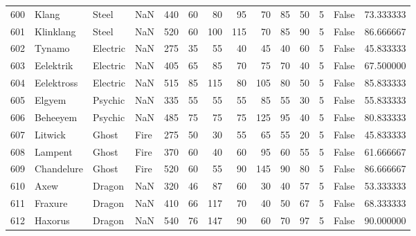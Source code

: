 \begin{tabular}{rlllrrrrrrrrlr}
 600 &                      Klang &     Steel &       NaN &    440 &   60 &      80 &       95 &       70 &       85 &     50 &           5 &      False &   73.333333 \\
 601 &                  Klinklang &     Steel &       NaN &    520 &   60 &     100 &      115 &       70 &       85 &     90 &           5 &      False &   86.666667 \\
 602 &                     Tynamo &  Electric &       NaN &    275 &   35 &      55 &       40 &       45 &       40 &     60 &           5 &      False &   45.833333 \\
 603 &                  Eelektrik &  Electric &       NaN &    405 &   65 &      85 &       70 &       75 &       70 &     40 &           5 &      False &   67.500000 \\
 604 &                 Eelektross &  Electric &       NaN &    515 &   85 &     115 &       80 &      105 &       80 &     50 &           5 &      False &   85.833333 \\
 605 &                     Elgyem &   Psychic &       NaN &    335 &   55 &      55 &       55 &       85 &       55 &     30 &           5 &      False &   55.833333 \\
 606 &                   Beheeyem &   Psychic &       NaN &    485 &   75 &      75 &       75 &      125 &       95 &     40 &           5 &      False &   80.833333 \\
 607 &                    Litwick &     Ghost &      Fire &    275 &   50 &      30 &       55 &       65 &       55 &     20 &           5 &      False &   45.833333 \\
 608 &                    Lampent &     Ghost &      Fire &    370 &   60 &      40 &       60 &       95 &       60 &     55 &           5 &      False &   61.666667 \\
 609 &                 Chandelure &     Ghost &      Fire &    520 &   60 &      55 &       90 &      145 &       90 &     80 &           5 &      False &   86.666667 \\
 610 &                       Axew &    Dragon &       NaN &    320 &   46 &      87 &       60 &       30 &       40 &     57 &           5 &      False &   53.333333 \\
 611 &                    Fraxure &    Dragon &       NaN &    410 &   66 &     117 &       70 &       40 &       50 &     67 &           5 &      False &   68.333333 \\
 612 &                    Haxorus &    Dragon &       NaN &    540 &   76 &     147 &       90 &       60 &       70 &     97 &           5 &      False &   90.000000 \\

\end{tabular}
